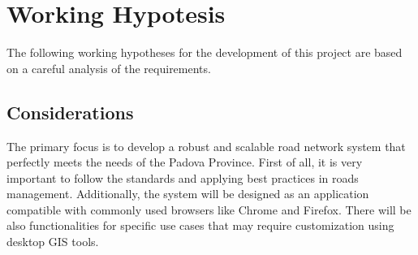 \section{Working Hypotesis}
The following working hypotheses for the development of this project are based on a careful analysis of the requirements.
\subsection{Considerations}
The primary focus is to develop a robust and scalable road network system that perfectly meets the needs of the Padova Province. First of all, it is very important to follow the standards and applying best practices in roads management. Additionally, the system will be designed as an application compatible with commonly used browsers like Chrome and Firefox. There will be also functionalities for specific use cases that may require customization using desktop GIS tools.

